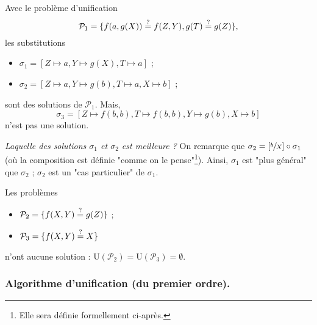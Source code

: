 \documentclass[../main]{subfiles}
\begin{document}
  \begin{exm}
    Avec le problème d'unification \[
    \mathcal{P}_1 = \{f(a,g(X)) \mathrel{\overset ? =} f(Z, Y), g(T) \mathrel{\overset ? =} g(Z) \} 
    ,\]
    les substitutions 
    \begin{itemize}
      \item $\sigma_1 = [Z \mapsto a, Y \mapsto g(X), T \mapsto a]$ ;
      \item $\sigma_2 = [Z \mapsto a, Y \mapsto g(b), T\mapsto a, X \mapsto b]$ ;
    \end{itemize}
    sont des solutions de $\mathcal{P}_1$. Mais, \[
      \sigma_3 = [Z \mapsto f(b,b), T \mapsto f(b,b), Y \mapsto g(b), X \mapsto b]
    \] n'est pas une solution.

    \textsl{Laquelle des solutions $\sigma_1$ et $\sigma_2$ est meilleure ?}
    On remarque que $\sigma_2 = [\sfrac{b}{X}] \circ \sigma_1$ (où la composition est définie "comme on le pense"\footnote{Elle sera définie formellement ci-après.}).
    Ainsi, $\sigma_1$ est "plus général" que $\sigma_2$ ; $\sigma_2$ est un "cas particulier" de $\sigma_1$.
  \end{exm}

  \begin{exm}
    Les problèmes 
    \begin{itemize}
      \item $\mathcal{P}_2 = \{f(X,Y) \mathrel{\overset ? =} g(Z)\}$ ;
      \item $\mathcal{P}_3 = \{f(X,Y) \mathrel{\overset ? =} X\}$
    \end{itemize}
    n'ont aucune solution : $\mathrm{U}(\mathcal{P}_2) = \mathrm{U}(\mathcal{P}_3) = \emptyset$.
  \end{exm}

  \subsubsection{Algorithme d'unification (du premier ordre).}
\end{document}
